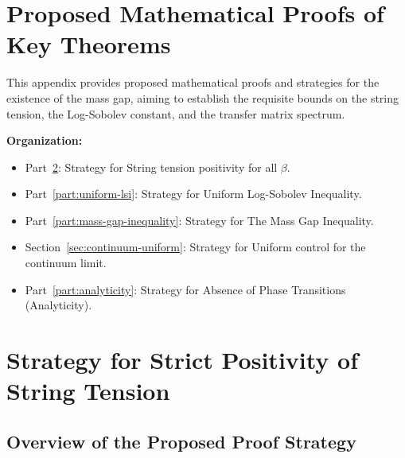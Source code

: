%
%
%

\section{Proposed Mathematical Proofs of Key Theorems}
\label{sec:app143-proofs}

This appendix provides proposed mathematical proofs and strategies for the existence of the mass gap,
aiming to establish the requisite bounds on the string tension, the Log-Sobolev constant,
and the transfer matrix spectrum.

\textbf{Organization:}
\begin{itemize}
\item Part~\ref{part:tension-positivity}: Strategy for String tension positivity for all $\beta$.
\item Part~\ref{part:uniform-lsi}: Strategy for Uniform Log-Sobolev Inequality.
\item Part~\ref{part:mass-gap-inequality}: Strategy for The Mass Gap Inequality.
\item Section~\ref{sec:continuum-uniform}: Strategy for Uniform control for the continuum limit.
\item Part~\ref{part:analyticity}: Strategy for Absence of Phase Transitions (Analyticity).
\end{itemize}

\section{Strategy for Strict Positivity of String Tension}
\label{part:tension-positivity}

\subsection{Overview of the Proposed Proof Strategy}
\label{sec:tension-overview}

